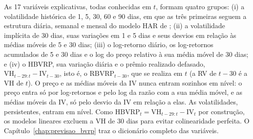 As 17 variáveis explicativas, todas conhecidas em $t$, formam quatro grupos:
(i) a volatilidade histórica de 1, 5, 30, 60 e 90 dias, em que as três
primeiras seguem a estrutura diária, semanal e mensal do modelo HAR de
\citet{corsi2009har}; (ii) a volatilidade implícita de 30 dias, suas variações
em 1 e 5 dias e seus desvios em relação às médias móveis de 5 e 30 dias;
(iii) o log-retorno diário, os log-retornos acumulados de 5 e 30 dias e o log
do preço relativo à sua média móvel de 30 dias; e (iv) o HBVRP, sua variação
diária e o prêmio realizado defasado,
$\text{VH}_{t-29:t} - \text{IV}_{t-30}$, isto é, o $\text{RBVRP}_{t-30}$, que
se realiza em $t$ (a RV de $t-30$ é a VH de $t$). O preço e as médias móveis
da IV nunca entram sozinhos em nível: o preço entra só por log-retornos e pelo
log da razão com a sua média móvel, e as médias móveis da IV, só pelo desvio
da IV em relação a elas. As volatilidades, persistentes, entram em nível. Como
$\text{HBVRP}_t = \text{VH}_{t-29:t} - \text{IV}_t$ por construção, os modelos lineares excluem a VH de 30 dias para
evitar colinearidade perfeita. O Capítulo~\ref{chap:previsao_bvrp} traz o dicionário
completo das variáveis.
